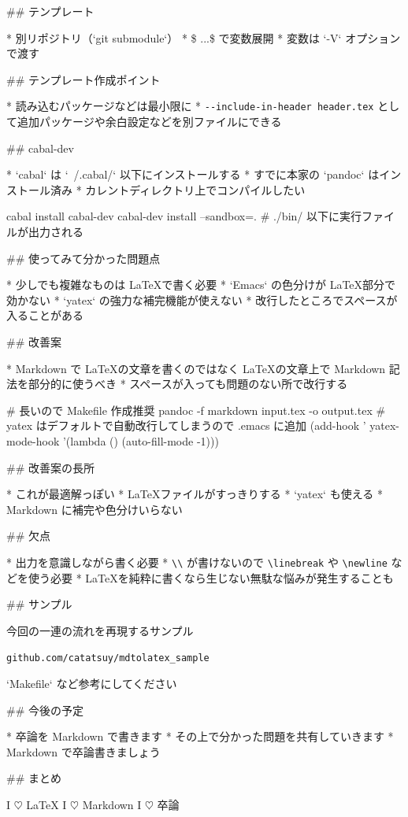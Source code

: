 ## テンプレート

* 別リポジトリ（`git submodule`）
* \$ ...\$ で変数展開
    * 変数は `-V` オプションで渡す


## テンプレート作成ポイント

* 読み込むパッケージなどは最小限に
* \verb+--include-in-header header.tex+ として追加パッケージや余白設定などを別ファイルにできる


## cabal-dev

* `cabal` は `~/.cabal/` 以下にインストールする
* すでに本家の `pandoc` はインストール済み
* カレントディレクトリ上でコンパイルしたい

\small

    cabal install cabal-dev
    cabal-dev install --sandbox=.
    # ./bin/ 以下に実行ファイルが出力される


## 使ってみて分かった問題点

* 少しでも複雑なものは \LaTeX で書く必要
* `Emacs` の色分けが \LaTeX 部分で効かない
* `yatex` の強力な補完機能が使えない
* 改行したところでスペースが入ることがある


## 改善案

* Markdown で \LaTeX の文章を書くのではなく \LaTeX の文章上で Markdown 記法を部分的に使うべき
* スペースが入っても問題のない所で改行する

\small

    # 長いので Makefile 作成推奨
    pandoc -f markdown input.tex -o output.tex
    # yatex はデフォルトで自動改行してしまうので .emacs に追加
    (add-hook ' yatex-mode-hook '(lambda ()
                               (auto-fill-mode -1)))


## 改善案の長所

* これが最適解っぽい
* \LaTeX ファイルがすっきりする
* `yatex` も使える
* Markdown に補完や色分けいらない

## 欠点

* 出力を意識しながら書く必要
* \verb+\\+ が書けないので \verb+\linebreak+ や \verb+\newline+ などを使う必要
* \LaTeX を純粋に書くなら生じない無駄な悩みが発生することも


## サンプル

今回の一連の流れを再現するサンプル

\begin{center}
\verb+github.com/catatsuy/mdtolatex_sample+
\end{center}

`Makefile` など参考にしてください


## 今後の予定

* 卒論を Markdown で書きます
* その上で分かった問題を共有していきます
* Markdown で卒論書きましょう


## まとめ

\vspace{-25pt}
\begin{center}
 \Huge
 I $\heartsuit$ \LaTeX \linebreak
 I $\heartsuit$ Markdown \linebreak
 I $\heartsuit$ 卒論
\end{center}
